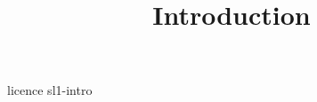 \documentclass [xcolor=table] {beamer}
\title {Introduction}
\begin{document}
 {licence}
 {sl1-intro}
\end{document}
